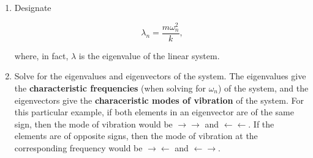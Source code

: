 \begin{enumerate}
    \item Designate

          \begin{equation*}
              \lambda_n = \frac{m\omega_n^2}{k}\text{,}
          \end{equation*}

          where, in fact, $\lambda$ is the eigenvalue of the linear system.

    \item Solve for the eigenvalues and eigenvectors of the system. The eigenvalues give the \textbf{characteristic frequencies} (when solving for $\omega_n$) of the system, and the eigenvectors give the \textbf{characeristic modes of vibration} of the system. For this particular example, if both elements in an eigenvector are of the same sign, then the mode of vibration would be $\rightarrow \rightarrow$ and $\leftarrow \leftarrow$. If the elements are of opposite signs, then the mode of vibration at the corresponding frequency would be $\rightarrow \leftarrow$ and $\leftarrow \rightarrow$.
\end{enumerate}
